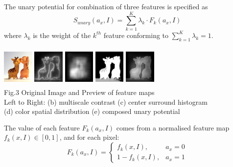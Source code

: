 \documentclass[10pt,twocolumn,letterpaper]{article}
\newcommand{\SUM}{\sum\limits}
\begin{document}
    The unary potential for combination of three features is specified as 
    $$
    S_{unary}(a_x,I) = \SUM_{k=1}^K \lambda_k \cdot F_k(a_x,I)
    $$
    where $\lambda_k$ is the weight of the $k^{th}$ feature conforming to $\sum_{k=1}^{K} \lambda_k = 1$.
    \begin{center} %
    \includegraphics[width=0.6in,height=0.8in]{./Figures/previews/raw.jpg}
    \includegraphics[width=0.6in,height=0.8in]{./Figures/previews/MC.jpg}
    \includegraphics[width=0.6in,height=0.8in]{./Figures/previews/CSH.jpg} 
    \includegraphics[width=0.6in,height=0.8in]{./Figures/previews/CSD.jpg} 
    \includegraphics[width=0.6in,height=0.8in]{./Figures/previews/Composed.jpg} \\
    {\footnotesize Fig.3 Original Image and Preview of feature maps \\ 
       Left to Right: (b) multiscale contrast  (c) center surround histogram \\[-1mm] 
    (d) color spatial distribution (e) composed unary potential}
    \end{center}
    The value of each feature $F_k(a_x,I)$ comes from a normalised feature map $f_k(x,I)\in[0,1]$, and for each pixel:
    $$
    F_k(a_x,I) = \left\{\begin{matrix}f_k(x,I), & a_x=0\\1-f_k(x,I), & a_x=1\end{matrix}\right. 
    $$
\end{document}
